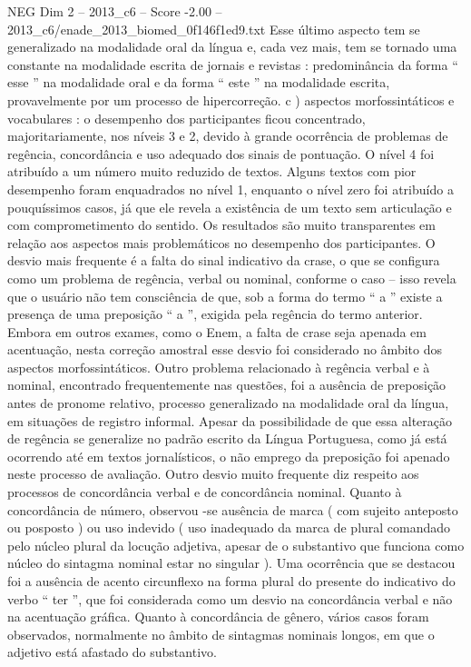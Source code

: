 \begin{textsample}{NEG Dim 2 – 2013\_c6 – Score -2.00 – 2013\_c6/enade\_2013\_biomed\_0f146f1ed9.txt}
Esse último aspecto tem se generalizado na modalidade oral da língua e, cada vez mais, tem se tornado uma constante na modalidade escrita de jornais e revistas : predominância da forma “ esse ” na modalidade oral e da forma “ este ” na modalidade escrita, provavelmente por um processo de hipercorreção. c ) aspectos morfossintáticos e vocabulares : o desempenho dos participantes ficou concentrado, majoritariamente, nos níveis 3 e 2, devido à grande ocorrência de problemas de regência, concordância e uso adequado dos sinais de pontuação.
O nível 4 foi atribuído a um número muito reduzido de textos.
Alguns textos com pior desempenho foram enquadrados no nível 1, enquanto o nível zero foi atribuído a pouquíssimos casos, já que ele revela a existência de um texto sem articulação e com comprometimento do sentido.
Os resultados são muito transparentes em relação aos aspectos mais problemáticos no desempenho dos participantes.
O desvio mais frequente é a falta do sinal indicativo da crase, o que se configura como um problema de regência, verbal ou nominal, conforme o caso – isso revela que o usuário não tem consciência de que, sob a forma do termo “ a ” existe a presença de uma preposição “ a ”, exigida pela regência do termo anterior.
Embora em outros exames, como o Enem, a falta de crase seja apenada em acentuação, nesta correção amostral esse desvio foi considerado no âmbito dos aspectos morfossintáticos.
Outro problema relacionado à regência verbal e à nominal, encontrado frequentemente nas questões, foi a ausência de preposição antes de pronome relativo, processo generalizado na modalidade oral da língua, em situações de registro informal.
Apesar da possibilidade de que essa alteração de regência se generalize no padrão escrito da Língua Portuguesa, como já está ocorrendo até em textos jornalísticos, o não emprego da preposição foi apenado neste processo de avaliação.
Outro desvio muito frequente diz respeito aos processos de concordância verbal e de concordância nominal.
Quanto à concordância de número, observou -se ausência de marca ( com sujeito anteposto ou posposto ) ou uso indevido ( uso inadequado da marca de plural comandado pelo núcleo plural da locução adjetiva, apesar de o substantivo que funciona como núcleo do sintagma nominal estar no singular ).
Uma ocorrência que se destacou foi a ausência de acento circunflexo na forma plural do presente do indicativo do verbo “ ter ”, que foi considerada como um desvio na concordância verbal e não na acentuação gráfica.
Quanto à concordância de gênero, vários casos foram observados, normalmente no âmbito de sintagmas nominais longos, em que o adjetivo está afastado do substantivo.

\end{textsample}
